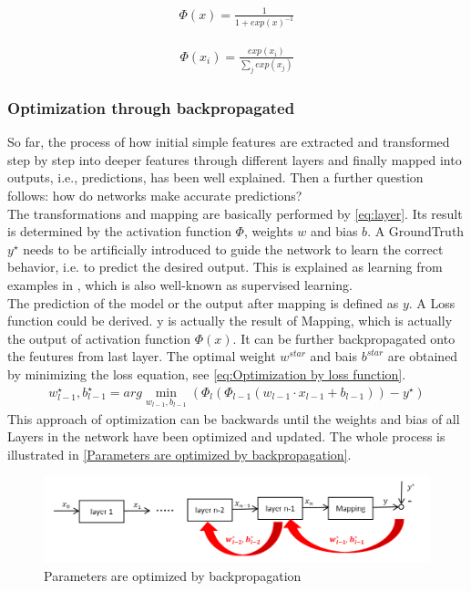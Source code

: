   \begin{align}
    \Phi(x) = \frac{1}{1+exp(x)^{-1}}  
     \label{eq:Sigmoid}
  \end{align}

  \begin{align}
    \Phi(x_{i}) = \frac{exp(x_{i})}{\sum_{j}exp(x_{j}) } 
     \label{eq:softmax}
  \end{align}
  \subsubsection{Optimization through backpropagated}
  So far, the process of how initial simple features are extracted and transformed step by step into deeper features through different layers and finally mapped into outputs, 
  i.e., predictions, has been well explained. Then a further question follows: how do networks make accurate predictions?\\
  The transformations and mapping are basically performed by \autoref{eq:layer}. Its result is determined by the activation function $\Phi$, weights $w$ and bias $b$. 
  A GroundTruth $y^{\star }$ needs to be artificially introduced to guide the network to learn the correct behavior, i.e. to predict the desired output. This is explained as
  learning from examples in \cite{russel2010}, which is also well-known as supervised learning. \\
  The prediction of the model or the output after mapping is defined as $y$. A Loss function could be derived. y is actually the result of Mapping, which is actually the output 
  of activation function $\Phi(x)$. It can be further backpropagated onto the feutures from last layer. The optimal weight $w^{star}$ and bais $b^{star}$ are obtained by 
  minimizing the loss equation, see \autoref{eq:Optimization by loss function}. 
  \begin{align}
    w_{l-1}^{\star}, b_{l-1}^{\star}=arg\min_{w_{l-1},b_{l-1}}(\Phi_{l}(\Phi_{l-1}(w_{l-1}\cdot x_{l-1}+b_{l-1}))-y^{\star } ) 
     \label{eq:Optimization by loss function}
  \end{align}
  This approach of optimization can be backwards until the weights and bias of all Layers in the network have been optimized and updated. The whole process is illustrated in 
  \autoref{Parameters are optimized by backpropagation}.
  \begin{figure}
    \centering
    \includegraphics[width=0.9\linewidth]{example_images/bachpropagation}
    \caption{Parameters are optimized by backpropagation}
    \label{Parameters are optimized by backpropagation}
  \end{figure}
